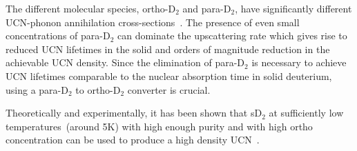 The different molecular species, ortho-D$_2$ and para-D$_2$, have
significantly different UCN-phonon annihilation
cross-sections~\cite{Liu2000, Morris2002}. The presence of even small
concentrations of para-D$_2$ can dominate the upscattering rate which
gives rise to reduced UCN lifetimes in the solid and orders of
magnitude reduction in the achievable UCN density.
Since the elimination of para-D$_2$ is necessary to achieve UCN
lifetimes comparable to the nuclear absorption time in solid
deuterium, using a para-D$_2$ to ortho-D$_2$ converter is crucial.


Theoretically and experimentally, it has been shown that sD$_2$ at
sufficiently low temperatures~(around 5K) with high enough purity and
with high ortho concentration can be used to produce a high density
UCN~\cite{Atchison2005}.







